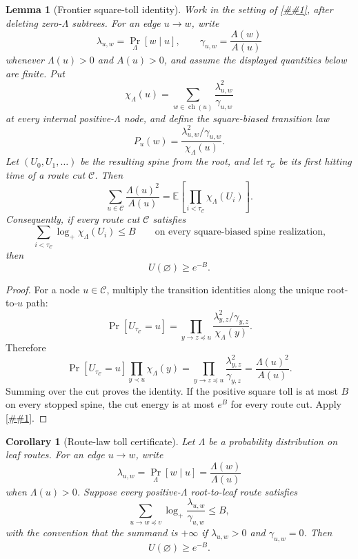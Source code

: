 \documentclass[10pt]{article}
\newcommand{\cref}[1]{\ref{##1}}
\newtheorem{lemma}[theorem]{Lemma}
\newtheorem{corollary}[theorem]{Corollary}
\theoremstyle{definition}
\newcommand{\E}{\mathbb{E}}
\begin{document}
\begin{lemma}[Frontier square-toll identity]\label{lem:frontier-square-toll}
   Work in the setting of \cref{lem:cut-energy-route-law}, after deleting
   zero-$\Lambda$ subtrees. For an edge $u\to w$, write
   \[
      \lambda_{u,w}=\Pr_\Lambda[w\mid u],
      \qquad
      \gamma_{u,w}=\frac{A(w)}{A(u)}
   \]
   whenever $\Lambda(u)>0$ and $A(u)>0$, and assume the displayed quantities
   below are finite. Put
   \[
      \chi_\Lambda(u)=
      \sum_{w\in\operatorname{ch}(u)}
      \frac{\lambda_{u,w}^2}{\gamma_{u,w}}
   \]
   at every internal positive-$\Lambda$ node, and define the square-biased
   transition law
   \[
      P_u(w)=
      \frac{\lambda_{u,w}^2/\gamma_{u,w}}{\chi_\Lambda(u)} .
   \]
   Let $(U_0,U_1,\ldots)$ be the resulting spine from the root, and let
   $\tau_{\mathcal C}$ be its first hitting time of a route cut
   $\mathcal C$. Then
   \[
      \sum_{u\in\mathcal C}\frac{\Lambda(u)^2}{A(u)}
      =
      \E\left[
         \prod_{i<\tau_{\mathcal C}}\chi_\Lambda(U_i)
      \right].
   \]
   Consequently, if every route cut $\mathcal C$ satisfies
   \[
      \sum_{i<\tau_{\mathcal C}}\log_+\chi_\Lambda(U_i)\le B
      \qquad
      \text{on every square-biased spine realization,}
   \]
   then
   \[
      U(\varnothing)\ge e^{-B}.
   \]
\end{lemma}

\begin{proof}
   For a node $u\in\mathcal C$, multiply the transition identities along the
   unique root-to-$u$ path:
   \[
      \Pr[U_{\tau_{\mathcal C}}=u]
      =
      \prod_{y\to z\preceq u}
      \frac{\lambda_{y,z}^2/\gamma_{y,z}}{\chi_\Lambda(y)} .
   \]
   Therefore
   \[
      \Pr[U_{\tau_{\mathcal C}}=u]
      \prod_{y\prec u}\chi_\Lambda(y)
      =
      \prod_{y\to z\preceq u}\frac{\lambda_{y,z}^2}{\gamma_{y,z}}
      =
      \frac{\Lambda(u)^2}{A(u)} .
   \]
   Summing over the cut proves the identity. If the positive square toll is at
   most $B$ on every stopped spine, the cut energy is at most $e^B$ for every
   route cut. Apply \cref{lem:cut-energy-route-law}.
\end{proof}

\begin{corollary}[Route-law toll certificate]\label{cor:route-law-toll}
   Let $\Lambda$ be a probability distribution on leaf routes. For an edge
   $u\to w$, write
   \[
      \lambda_{u,w}=\Pr_{\Lambda}[w\mid u]
      =
      \frac{\Lambda(w)}{\Lambda(u)}
   \]
   when $\Lambda(u)>0$. Suppose every positive-$\Lambda$ root-to-leaf route
   satisfies
   \[
      \sum_{u\to w\preceq v}
      \log_+\frac{\lambda_{u,w}}{\gamma_{u,w}}
      \le B,
   \]
   with the convention that the summand is $+\infty$ if
   $\lambda_{u,w}>0$ and $\gamma_{u,w}=0$. Then
   \[
      U(\varnothing)\ge e^{-B}.
   \]
\end{corollary}
\end{document}
